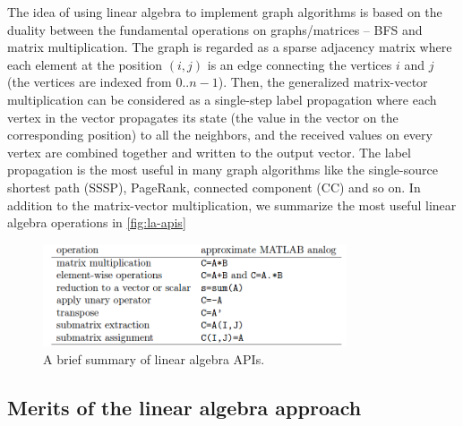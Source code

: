 \documentclass{sokendai_thesis} %
\begin{document}
The idea of using linear algebra to implement graph algorithms is based on the duality between the fundamental operations on graphs/matrices -- BFS and matrix multiplication.
The graph is regarded as a sparse adjacency matrix where each element at the position $(i,j)$ is an edge connecting the vertices $i$ and $j$ (the vertices are indexed from $0..n-1$).
Then, the generalized matrix-vector multiplication can be considered as a single-step label propagation where each vertex in the vector propagates its state (the value in the vector on the corresponding position) to all the neighbors, and the received values on every vertex are combined together and written to the output vector.
The label propagation is the most useful in many graph algorithms like the single-source shortest path (SSSP), PageRank, connected component (CC) and so on.
In addition to the matrix-vector multiplication, we summarize the most useful linear algebra operations in \autoref{fig:la-apis}
\begin{figure}
\centering
\includegraphics[width=0.8\textwidth]{figures/linear-algebra-apis.png}
\caption{A brief summary of linear algebra APIs.}
\label{fig:la-apis}
\end{figure}


\subsection{Merits of the linear algebra approach}
\end{document}
